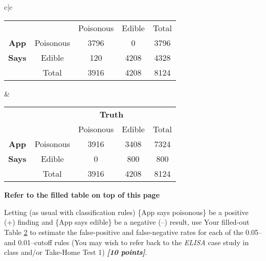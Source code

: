 \documentclass[12pt]{article}
\newcommand{\bi}[1]{\b{\i{#1}}}
\renewcommand{\b}[1]{\textbf{#1}}
\renewcommand{\i}[1]{\textit{#1}}
\begin{document}
\begin{itemize}
\begin{table}[t!]
\begin{tabular}{c|c}
\begin{tabular}{cc|c|c|c}
& \multicolumn{1}{c}{} & \multicolumn{1}{c}{Poisonous} & \multicolumn{1}{c}{Edible} & Total \\ \cline{3-4}

\textbf{App} & Poisonous & \multicolumn{1}{c|}{3796} & \multicolumn{1}{c|}{0} & {3796} \\ \cline{3-4}

\textbf{Says} & Edible & \multicolumn{1}{c|}{120} & \multicolumn{1}{c|}{4208} & {4328} \\ \cline{3-4}

& \multicolumn{1}{c|}{Total} & {3916} & {4208} & {8124}\\ \cline{3-4}

\end{tabular}

& 

\begin{tabular}{cc|c|c|c}

& \multicolumn{1}{c}{} & \multicolumn{2}{c}{\textbf{Truth}} \\

& \multicolumn{1}{c}{} & \multicolumn{1}{c}{Poisonous} & \multicolumn{1}{c}{Edible} & Total \\ \cline{3-4}

\textbf{App} & Poisonous & \multicolumn{1}{c|}{3916} & \multicolumn{1}{c|}{3408} & {7324} \\ \cline{3-4}

\textbf{Says} & Edible & \multicolumn{1}{c|}{0} & \multicolumn{1}{c|}{800} & {800}\\ \cline{3-4}

& \multicolumn{1}{c|}{Total} & {3916} & {4208} & {8124}\\ \cline{3-4}

\end{tabular}

\end{tabular}

\label{t:decision-rules-1}

\end{table}

{\color{blue}
\textbf{Refer to the filled table on top of this page}
}

Letting (as usual with classification rules) \{App says poisonous\} be a positive (+) finding and \{App says edible\} be a negative (--) result, use Your filled-out Table \ref{t:decision-rules-1} to estimate the false-positive and false-negative rates for each of the 0.05-- and 0.01--cutoff rules  (You may wish to refer back to the \textit{ELISA} case study in class and/or Take-Home Test 1) \bi{[10 points]}.


\end{itemize}
\end{document}
